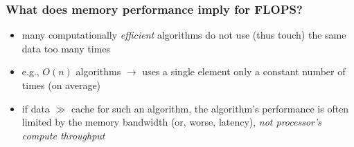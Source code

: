 \documentclass[12pt,dvipdfmx]{beamer}
\newcommand{\aka}[1]{{\color{red}#1}}
\begin{document}
\begin{frame}
\frametitle{What does memory performance imply for FLOPS?}
\begin{itemize}
\item<1-> many computationally \emph{efficient} algorithms do not use
  (thus touch) the same data too many times
\item<2-> e.g., $O(n)$ algorithms $\rightarrow$ 
  uses a single element only a constant number of times (on average)

\item<3-> if data $\gg$ cache for such an algorithm,
  the algorithm's performance is often 
  limited by the memory bandwidth (or, worse, latency), 
  \aka{\em not processor's compute throughput}
\end{itemize}
\end{frame}
\end{document}
